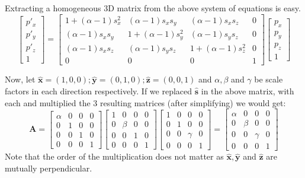 \documentclass[]{report}   %
\begin{document}
Extracting a homogeneous 3D matrix from the above system of equations is easy.
\[
	\begin{bmatrix}
	p\prime_x \\
	p\prime_y \\
	p\prime_z \\
	1
	\end{bmatrix}
	=	
	\begin{bmatrix}
	1 + (\alpha - 1)s_x^2 & (\alpha - 1)s_x s_y & (\alpha - 1)s_x s_z &  0  \\
	(\alpha - 1)s_x s_y & 1 + (\alpha - 1)s_y^2 & (\alpha - 1)s_y s_z &  0  \\
	(\alpha - 1)s_x s_z & (\alpha - 1)s_y s_z  & 1 + (\alpha - 1)s_z^2 & 0  \\
	0 & 0 & 0 &	1
	\end{bmatrix}
	\begin{bmatrix}
		p_x \\
		p_y \\
		p_z \\
		1
	\end{bmatrix}
\]


Now, let \(\mathbf{\hat{x}} =(1,0,0); \mathbf{\hat{y}} =(0,1,0); \mathbf{\hat{z}} =(0,0,1)\) and \(\alpha,\beta\) and \(\gamma\) be scale factors in each direction respectively. If we replaced \(\mathbf{\hat{s}}\) in the above matrix, with each and multiplied the 3 resulting matrices (after simplifying) we would get:
\[
	\mathbf{A} =
	\begin{bmatrix}
		\alpha & 0 & 0 & 0 \\
		0 &	1 & 0 & 0 \\
		0 & 0 & 1 &	0 \\
		0 & 0 & 0 &	1
	\end{bmatrix}
	\begin{bmatrix}
		1 & 0 & 0 & 0 \\
		0 &	\beta & 0 & 0 \\
		0 & 0 & 1 &	0 \\
		0 & 0 & 0 &	1
	\end{bmatrix}
	\begin{bmatrix}
		1 & 0 & 0 & 0 \\
		0 &	1 & 0 & 0 \\
		0 & 0 & \gamma &	0 \\
		0 & 0 & 0 &	1
	\end{bmatrix}
	=
	\begin{bmatrix}
		\alpha & 0 & 0 & 0 \\
		0 &	\beta & 0 & 0 \\
		0 & 0 & \gamma &	0 \\
		0 & 0 & 0 &	1
	\end{bmatrix}	
\]
Note that the order of the multiplication does not matter as \(\mathbf{\hat{x}}, \mathbf{\hat{y}}\) and \(\mathbf{\hat{z}}\) are mutually perpendicular.
 
\end{document}
